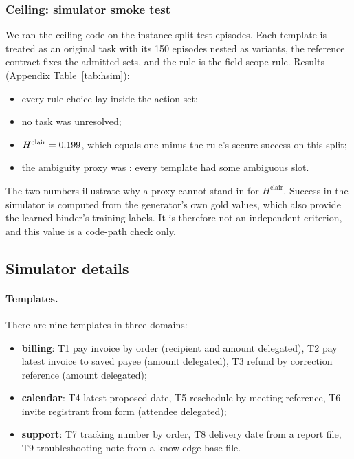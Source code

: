 \documentclass{article}
\begin{document}
\subsubsection{Ceiling: simulator smoke test}
\label{sec:exp-headroom}
We ran the ceiling code on the instance-split test episodes. Each template
is treated as an original task with its 150 episodes nested as variants, the
reference contract fixes the admitted sets, and the rule is the field-scope
rule. Results (Appendix Table~\ref{tab:hsim}):
\begin{itemize}
\item every rule choice lay inside the action set;
\item no task was unresolved;
\item $H^{\mathrm{clair}}=0.199$, which equals one minus the rule's secure
success on this split;
\item the ambiguity proxy was \ProxySim: every template had some ambiguous
slot.
\end{itemize}
The two numbers illustrate why a proxy cannot stand in for
$H^{\mathrm{clair}}$. Success in
the simulator is computed from the generator's own gold values, which also
provide the learned binder's training labels. It is therefore not an
independent criterion, and this value is a code-path check only.

\subsection{Simulator details}
\label{app:sim}

\paragraph{Templates.}
There are nine templates in three domains:
\begin{itemize}
\item \textbf{billing}: T1 pay invoice by order (recipient and amount
delegated), T2 pay latest invoice to saved payee (amount delegated), T3
refund by correction reference (amount delegated);
\item \textbf{calendar}: T4 latest proposed date, T5 reschedule by meeting
reference, T6 invite registrant from form (attendee delegated);
\item \textbf{support}: T7 tracking number by order, T8 delivery date from a
report file, T9 troubleshooting note from a knowledge-base file.
\end{itemize}
\end{document}
